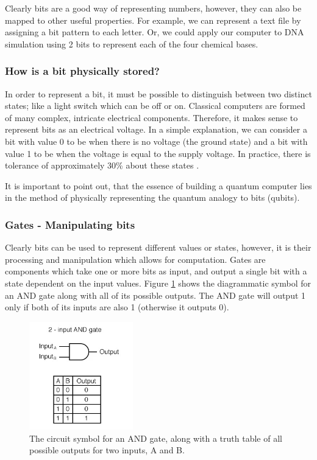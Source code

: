 Clearly bits are a good way of representing numbers, however, they can also be mapped to other useful properties. For example, we can represent a text file by assigning a bit pattern to each letter. Or, we could apply our computer to DNA simulation using 2 bits to represent each of the four chemical bases. 

\subsubsection{How is a bit physically stored?}
In order to represent a bit, it must be possible to distinguish between two distinct states; like a light switch which can be off or on. Classical computers are formed of many complex, intricate electrical components. Therefore, it makes sense to represent bits as an electrical voltage. In a simple explanation, we can consider a bit with value 0 to be when there is no voltage (the ground state) and a bit with value 1 to be when the voltage is equal to the supply voltage. In practice, there is tolerance of approximately 30\% about these states \cite{voltage}.

It is important to point out, that the essence of building a quantum computer lies in the method of physically representing the quantum analogy to bits (qubits). 

\subsubsection{Gates - Manipulating bits}
Clearly bits can be used to represent different values or states, however, it is their processing and manipulation which allows for computation. Gates are components which take one or more bits as input, and output a single bit with a state dependent on the input values. Figure \ref{fig:ANDGATE} shows the diagrammatic symbol for an AND gate along with all of its possible outputs. The AND gate will output 1 only if both of its inputs are also 1 (otherwise it outputs 0).
\begin{figure}[H]
    \centering
    \includegraphics[width=0.4\textwidth]{images/andgate.jpeg}
    \caption{The circuit symbol for an AND gate, along with a truth table of all possible outputs for two inputs, A and B. \cite{andgate}}\label{fig:ANDGATE}
\end{figure}

